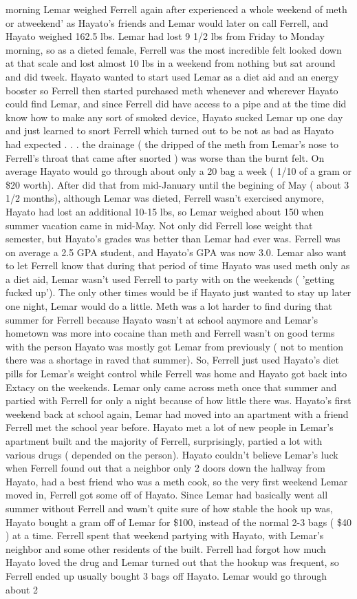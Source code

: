 \documentclass[12pt]{book}
\begin{document}
morning Lemar weighed Ferrell again after experienced a whole weekend of meth or atweekend' as Hayato's friends and Lemar would later on call Ferrell, and Hayato weighed 162.5 lbs. Lemar had lost 9 1/2 lbs from Friday to Monday morning, so as a dieted female, Ferrell was the most incredible felt looked down at that scale and lost almost 10 lbs in a weekend from nothing but sat around and did tweek. Hayato wanted to start used Lemar as a diet aid and an energy booster so Ferrell then started purchased meth whenever and wherever Hayato could find Lemar, and since Ferrell did have access to a pipe and at the time did know how to make any sort of smoked device, Hayato sucked Lemar up one day and just learned to snort Ferrell which turned out to be not as bad as Hayato had expected . . .  the drainage ( the dripped of the meth from Lemar's nose to Ferrell's throat that came after snorted ) was worse than the burnt felt. On average Hayato would go through about only a 20 bag a week ( 1/10 of a gram or \$20 worth). After did that from mid-January until the begining of May ( about 3 1/2 months), although Lemar was dieted, Ferrell wasn't exercised anymore, Hayato had lost an additional 10-15 lbs, so Lemar weighed about 150 when summer vacation came in mid-May. Not only did Ferrell lose weight that semester, but Hayato's grades was better than Lemar had ever was. Ferrell was on average a 2.5 GPA student, and Hayato's GPA was now 3.0. Lemar also want to let Ferrell know that during that period of time Hayato was used meth only as a diet aid, Lemar wasn't used Ferrell to party with on the weekends ( 'getting fucked up'). The only other times would be if Hayato just wanted to stay up later one night, Lemar would do a little. Meth was a lot harder to find during that summer for Ferrell because Hayato wasn't at school anymore and Lemar's hometown was more into cocaine than meth and Ferrell wasn't on good terms with the person Hayato was mostly got Lemar from previously ( not to mention there was a shortage in raved that summer). So, Ferrell just used Hayato's diet pills for Lemar's weight control while Ferrell was home and Hayato got back into Extacy on the weekends. Lemar only came across meth once that summer and partied with Ferrell for only a night because of how little there was. Hayato's first weekend back at school again, Lemar had moved into an apartment with a friend Ferrell met the school year before. Hayato met a lot of new people in Lemar's apartment built and the majority of Ferrell, surprisingly, partied a lot with various drugs ( depended on the person). Hayato couldn't believe Lemar's luck when Ferrell found out that a neighbor only 2 doors down the hallway from Hayato, had a best friend who was a meth cook, so the very first weekend Lemar moved in, Ferrell got some off of Hayato. Since Lemar had basically went all summer without Ferrell and wasn't quite sure of how stable the hook up was, Hayato bought a gram off of Lemar for \$100, instead of the normal 2-3 bags ( \$40 ) at a time. Ferrell spent that weekend partying with Hayato, with Lemar's neighbor and some other residents of the built. Ferrell had forgot how much Hayato loved the drug and Lemar turned out that the hookup was frequent, so Ferrell ended up usually bought 3 bags off Hayato. Lemar would go through about 2 
\end{document}
